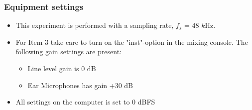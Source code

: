 \subsubsection{Equipment settings}
\begin{itemize}
	\item This experiment is performed with a sampling rate, $f_{s}$ = 48 $k$Hz. 
	\item For Item 3 take care to turn on the "inst"-option in the mixing console. The following gain settings are present: 		
	\begin{itemize}
		\item Line level gain is 0 dB
		\item Ear Microphones has gain +30 dB
	\end{itemize}
	\item All settings on the computer is set to 0 dBFS
\end{itemize}
	
	
